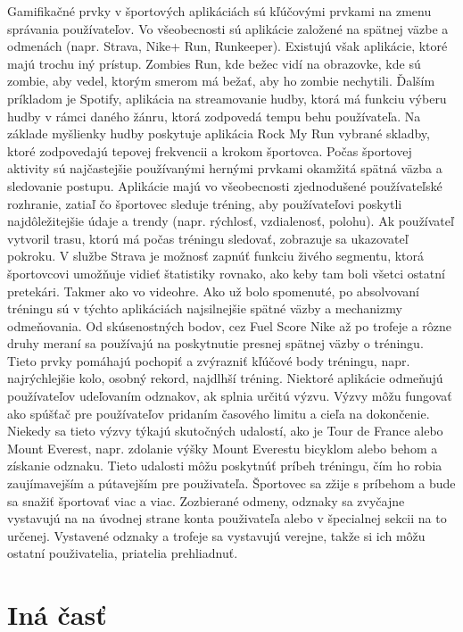 \documentclass[10pt,twoside,slovak,a4paper]{article}
\begin{document}
Gamifikačné prvky v športových aplikáciách sú kľúčovými prvkami na zmenu správania používateľov. Vo všeobecnosti sú aplikácie založené na spätnej väzbe a odmenách (napr. Strava, Nike+ Run, Runkeeper). Existujú však aplikácie, ktoré majú trochu iný prístup. Zombies Run, kde bežec vidí na obrazovke, kde sú zombie, aby vedel, ktorým smerom má bežať, aby ho zombie nechytili. Ďalším príkladom je Spotify, aplikácia na streamovanie hudby, ktorá má funkciu výberu hudby v rámci daného žánru, ktorá zodpovedá tempu behu používateľa. Na základe myšlienky hudby poskytuje aplikácia Rock My Run vybrané skladby, ktoré zodpovedajú tepovej frekvencii a krokom športovca. Počas športovej aktivity sú najčastejšie používanými hernými prvkami okamžitá spätná väzba a sledovanie postupu. Aplikácie majú vo všeobecnosti zjednodušené používateľské rozhranie, zatiaľ čo športovec sleduje tréning, aby používateľovi poskytli najdôležitejšie údaje a trendy (napr. rýchlosť, vzdialenosť, polohu). Ak používateľ vytvoril trasu, ktorú má počas tréningu sledovať, zobrazuje sa ukazovateľ pokroku. V službe Strava je možnosť zapnúť funkciu živého segmentu, ktorá športovcovi umožňuje vidieť štatistiky rovnako, ako keby tam boli všetci ostatní pretekári. Takmer ako vo videohre.
Ako už bolo spomenuté, po absolvovaní tréningu sú v týchto aplikáciách najsilnejšie spätné väzby a mechanizmy odmeňovania. Od skúsenostných bodov, cez Fuel Score Nike až po trofeje a rôzne druhy meraní sa používajú na poskytnutie presnej spätnej väzby o tréningu. Tieto prvky pomáhajú pochopiť a zvýrazniť kľúčové body tréningu, napr. najrýchlejšie kolo, osobný rekord, najdlhší tréning.
Niektoré aplikácie odmeňujú používateľov udeľovaním odznakov, ak splnia určitú výzvu. Výzvy môžu fungovať ako spúšťač pre používateľov pridaním časového limitu a cieľa na dokončenie. Niekedy sa tieto výzvy týkajú skutočných udalostí, ako je Tour de France alebo Mount Everest, napr. zdolanie výšky Mount Everestu bicyklom alebo behom a získanie odznaku. Tieto udalosti môžu poskytnúť príbeh tréningu, čím ho robia zaujímavejším a pútavejším pre použivateľa. Športovec sa zžije s príbehom a bude sa snažiť športovať viac a viac. Zozbierané odmeny, odznaky sa zvyčajne vystavujú na na úvodnej strane konta použivateľa alebo v špecialnej sekcii na to určenej. Vystavené odznaky a trofeje sa vystavujú verejne, takže si ich môžu ostatní použivatelia, priatelia prehliadnuť.

\cite{Coplien:MPD}

\section{Iná časť} \label{ina}
\end{document}
